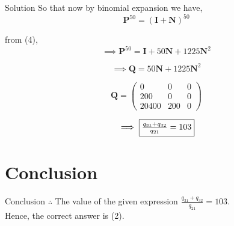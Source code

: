 \documentclass{beamer}
\let\vec\mathbf
\providecommand{\brak}[1]{\ensuremath{\left(#1\right)}}
\theoremstyle{remark}
\newcommand{\myvec}[1]{\ensuremath{\begin{pmatrix}#1\end{pmatrix}}}
\begin{document}
\begin{frame}{Solution}
So that now by binomial expansion we have,
\begin{equation}
    \vec{P}^{50} = \brak{\vec{I}+\vec{N}}^{50} 
\end{equation}

from (4),
\begin{equation}
    \implies \vec{P}^{50} = \vec{I} + 50\vec{N} + 1225\vec{N}^2
\end{equation}

\begin{equation}
    \implies \vec{Q} = 50\vec{N} + 1225\vec{N}^2
\end{equation}

\begin{equation}
    \vec{Q} = \myvec{0&0&0\\200&0&0\\20400&200&0}
\end{equation}

\begin{equation}
    \implies \fbox{$\frac{q_{31}+q_{32}}{q_{21}} = 103$}
\end{equation}
\end{frame}

\section{Conclusion}
\begin{frame}{Conclusion}
$\therefore$ The value of the given expression $\frac{q_{31}+q_{32}}{q_{21}} = 103$.\\
Hence, the correct answer is (2).
\end{frame}
\end{document}
